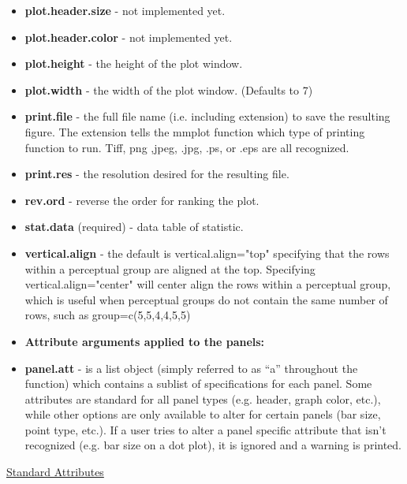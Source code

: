 \documentclass{article}
\begin{document}
\begin{itemize}
\item  \textbf{plot.header.size} - not implemented yet.
\item  \textbf{plot.header.color} - not implemented yet.
\item  \textbf{plot.height} - the height of the plot window.
\item  \textbf{plot.width} - the width of the plot window. (Defaults to 7)
\item  \textbf{print.file} - the full file name (i.e. including extension) to save the resulting figure. The extension tells the mmplot function which type of printing function to run. Tiff, png ,jpeg, .jpg, .ps, or .eps are all recognized.
\item  \textbf{print.res} - the resolution desired for the resulting file.
\item  \textbf{rev.ord} - reverse the order for ranking the plot.
\item  \textbf{stat.data} (required) - data table of statistic.
\item  \textbf{vertical.align} - the default is vertical.align="top" specifying that the rows within a perceptual group are aligned at the top.  Specifying vertical.align="center" will center align the rows within a perceptual group, which is useful when perceptual groups do not contain the same number of rows, such as group=c(5,5,4,4,5,5)
\item  \textbf{Attribute arguments applied to the panels:}
\item  \textbf{panel.att} - is a list object (simply referred to as ``a'' throughout the function) which contains a sublist of
specifications for each panel. Some attributes are standard for all panel types (e.g. header, graph color, etc.), while
other options are only available to alter for certain panels (bar size, point type, etc.). If a user tries to alter a panel
specific attribute that isn't recognized (e.g. bar size on a dot plot), it is ignored and a warning is printed.
\end{itemize}
\underline{Standard Attributes}
\end{document}
